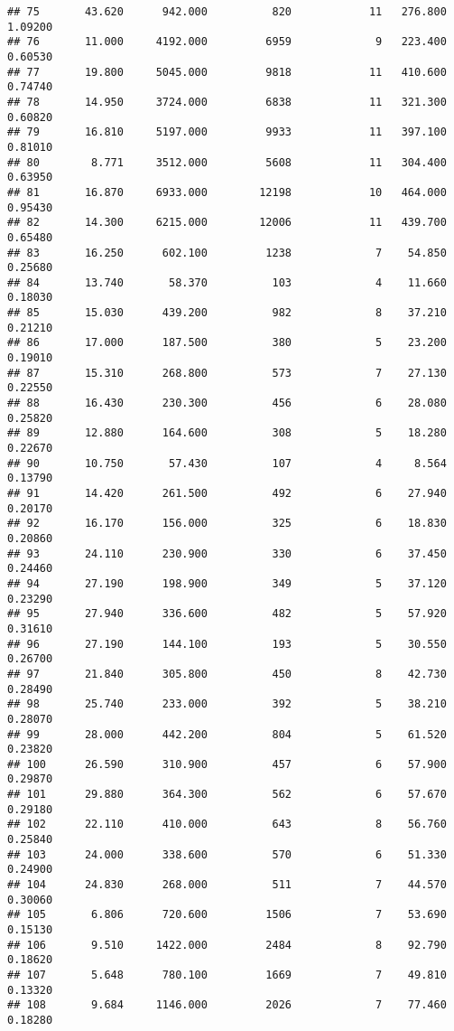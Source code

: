 \documentclass[]{article}
\begin{document}
\begin{verbatim}
## 75       43.620      942.000          820            11   276.800 1.09200
## 76       11.000     4192.000         6959             9   223.400 0.60530
## 77       19.800     5045.000         9818            11   410.600 0.74740
## 78       14.950     3724.000         6838            11   321.300 0.60820
## 79       16.810     5197.000         9933            11   397.100 0.81010
## 80        8.771     3512.000         5608            11   304.400 0.63950
## 81       16.870     6933.000        12198            10   464.000 0.95430
## 82       14.300     6215.000        12006            11   439.700 0.65480
## 83       16.250      602.100         1238             7    54.850 0.25680
## 84       13.740       58.370          103             4    11.660 0.18030
## 85       15.030      439.200          982             8    37.210 0.21210
## 86       17.000      187.500          380             5    23.200 0.19010
## 87       15.310      268.800          573             7    27.130 0.22550
## 88       16.430      230.300          456             6    28.080 0.25820
## 89       12.880      164.600          308             5    18.280 0.22670
## 90       10.750       57.430          107             4     8.564 0.13790
## 91       14.420      261.500          492             6    27.940 0.20170
## 92       16.170      156.000          325             6    18.830 0.20860
## 93       24.110      230.900          330             6    37.450 0.24460
## 94       27.190      198.900          349             5    37.120 0.23290
## 95       27.940      336.600          482             5    57.920 0.31610
## 96       27.190      144.100          193             5    30.550 0.26700
## 97       21.840      305.800          450             8    42.730 0.28490
## 98       25.740      233.000          392             5    38.210 0.28070
## 99       28.000      442.200          804             5    61.520 0.23820
## 100      26.590      310.900          457             6    57.900 0.29870
## 101      29.880      364.300          562             6    57.670 0.29180
## 102      22.110      410.000          643             8    56.760 0.25840
## 103      24.000      338.600          570             6    51.330 0.24900
## 104      24.830      268.000          511             7    44.570 0.30060
## 105       6.806      720.600         1506             7    53.690 0.15130
## 106       9.510     1422.000         2484             8    92.790 0.18620
## 107       5.648      780.100         1669             7    49.810 0.13320
## 108       9.684     1146.000         2026             7    77.460 0.18280

\end{verbatim}
\end{document}
